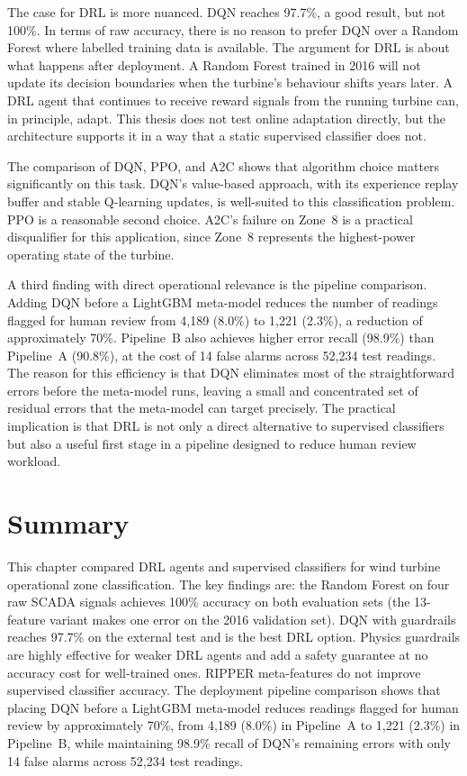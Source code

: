 The case for DRL is more nuanced. DQN reaches 97.7\%, a good result, but not 100\%. In
terms of raw accuracy, there is no reason to prefer DQN over a Random Forest where
labelled training data is available. The argument for DRL is about what happens after
deployment. A Random Forest trained in 2016 will not update its decision boundaries when
the turbine's behaviour shifts years later. A DRL agent that continues to receive reward
signals from the running turbine can, in principle, adapt. This thesis does not test
online adaptation directly, but the architecture supports it in a way that a static
supervised classifier does not.

The comparison of DQN, PPO, and A2C shows that algorithm choice matters significantly
on this task. DQN's value-based approach, with its experience replay buffer and stable
Q-learning updates, is well-suited to this classification problem. PPO is a reasonable
second choice. A2C's failure on Zone~8 is a practical disqualifier for this application,
since Zone~8 represents the highest-power operating state of the turbine.

A third finding with direct operational relevance is the pipeline comparison. Adding DQN
before a LightGBM meta-model reduces the number of readings flagged for human review
from 4,189 (8.0\%) to 1,221 (2.3\%), a reduction of approximately 70\%. Pipeline~B also
achieves higher error recall (98.9\%) than Pipeline~A (90.8\%), at the cost of 14 false
alarms across 52,234 test readings. The reason for this efficiency is that DQN eliminates
most of the straightforward errors before the meta-model runs, leaving a small and
concentrated set of residual errors that the meta-model can target precisely. The
practical implication is that DRL is not only a direct alternative to supervised
classifiers but also a useful first stage in a pipeline designed to reduce human review
workload.

\section{Summary}
\label{sec:ch4:summary}

This chapter compared DRL agents and supervised classifiers for wind turbine operational
zone classification. The key findings are: the Random Forest on four raw SCADA signals
achieves 100\% accuracy on both evaluation sets (the 13-feature variant makes one error
on the 2016 validation set). DQN with guardrails reaches 97.7\% on the external test and
is the best DRL option. Physics guardrails are highly effective for weaker DRL agents and
add a safety guarantee at no accuracy cost for well-trained ones. RIPPER meta-features
do not improve supervised classifier accuracy. The deployment pipeline comparison shows
that placing DQN before a LightGBM meta-model reduces readings flagged for human review
by approximately 70\%, from 4,189 (8.0\%) in Pipeline~A to 1,221 (2.3\%) in
Pipeline~B, while maintaining 98.9\% recall of DQN's remaining errors with only 14 false
alarms across 52,234 test readings.
